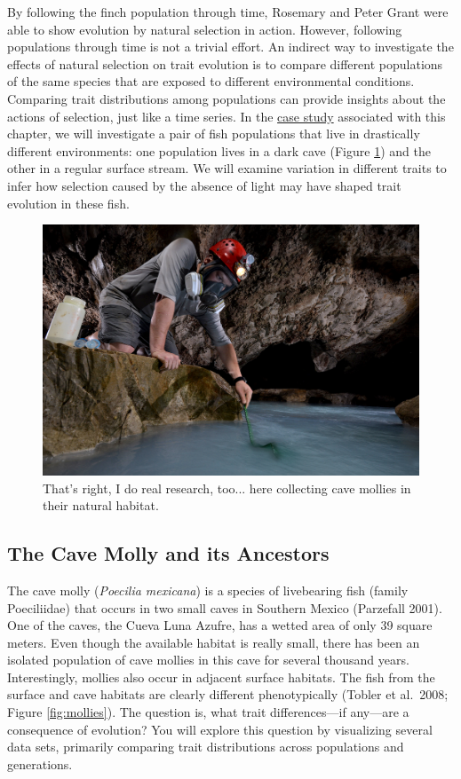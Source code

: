 \documentclass[
]{book}
\begin{document}
By following the finch population through time, Rosemary and Peter Grant were able to show evolution by natural selection in action. However, following populations through time is not a trivial effort. An indirect way to investigate the effects of natural selection on trait evolution is to compare different populations of the same species that are exposed to different environmental conditions. Comparing trait distributions among populations can provide insights about the actions of selection, just like a time series. In the \href{exercises/BIOL520-ex2.zip}{case study} associated with this chapter, we will investigate a pair of fish populations that live in drastically different environments: one population lives in a dark cave (Figure \ref{fig:fieldwork}) and the other in a regular surface stream. We will examine variation in different traits to infer how selection caused by the absence of light may have shaped trait evolution in these fish.

\begin{figure}
\includegraphics[width=1\linewidth]{images/field} \caption{That's right, I do real research, too... here collecting cave mollies in their natural habitat.}\label{fig:fieldwork}
\end{figure}

\hypertarget{the-cave-molly-and-its-ancestors}{%
\subsection{The Cave Molly and its Ancestors}\label{the-cave-molly-and-its-ancestors}}

The cave molly (\emph{Poecilia mexicana}) is a species of livebearing fish (family Poeciliidae) that occurs in two small caves in Southern Mexico (Parzefall 2001). One of the caves, the Cueva Luna Azufre, has a wetted area of only 39 square meters. Even though the available habitat is really small, there has been an isolated population of cave mollies in this cave for several thousand years. Interestingly, mollies also occur in adjacent surface habitats. The fish from the surface and cave habitats are clearly different phenotypically (Tobler et al.~2008; Figure \ref{fig:mollies}). The question is, what trait differences---if any---are a consequence of evolution? You will explore this question by visualizing several data sets, primarily comparing trait distributions across populations and generations.
\end{document}
